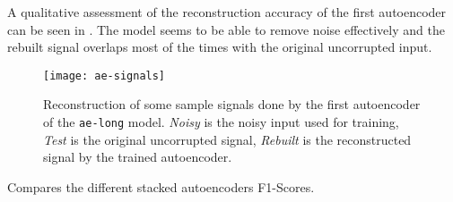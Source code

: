 A qualitative assessment of the reconstruction accuracy of the first autoencoder can be seen in . The model seems to be able to remove noise effectively and the rebuilt signal overlaps most of the times with the original uncorrupted input. \\

\begin{figure}[h]
	\captionsetup{font=scriptsize, justification=centering}
    \centering
	\texttt{[image: ae-signals]}
    \caption{Reconstruction of some sample signals done by the first autoencoder of the \texttt{ae-long} model. {\it Noisy} is the noisy input used for training, {\it Test} is the original uncorrupted signal, {\it Rebuilt} is the reconstructed signal by the trained autoencoder.}
    \label{fig:img_signal_reconstruction}
\end{figure}

 Compares the different stacked autoencoders \mbox{F1-Scores}.

\begin{table}[!htbp]
\footnotesize
\captionsetup{font=scriptsize, justification=centering}
\centering
{}
\caption{F1-Scores for various stacked autoencoders, \texttt{long} prefix indicates the deeper version of the first autoencoder, as presented in , \texttt{short} prefix indicates the shallower version. \texttt{gaus} suffix indicates the model trained with inputs corrupted by gaussian noise, \texttt{zero} instead indicates zero-masking corruption.}
\label{ae_comparison_table}
\end{table}

